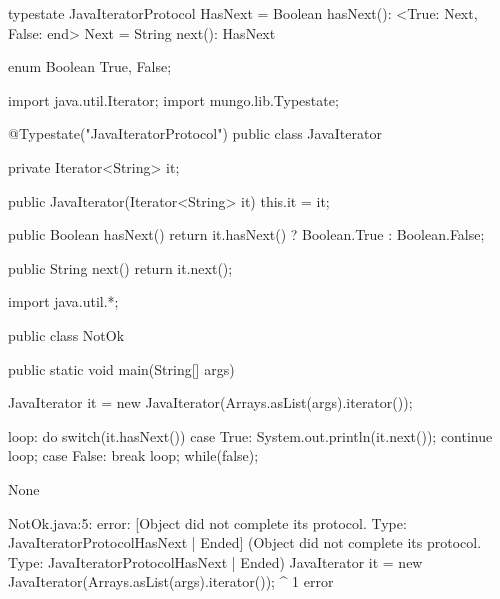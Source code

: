\begin{code}
typestate JavaIteratorProtocol {
  HasNext = {
    Boolean hasNext(): <True: Next, False: end>
  }
  Next = {
    String next(): HasNext
  }
}\end{code}

\begin{code}
enum Boolean {
	True, False;
}\end{code}

\begin{code}
import java.util.Iterator;
import mungo.lib.Typestate;

@Typestate("JavaIteratorProtocol")
public class JavaIterator {

  private Iterator<String> it;

  public JavaIterator(Iterator<String> it) {
    this.it = it;
  }

	public Boolean hasNext() {
    return it.hasNext() ? Boolean.True : Boolean.False;
  }

  public String next() {
    return it.next();
  }

}\end{code}

\begin{code}
import java.util.*;

public class NotOk {
	public static void main(String[] args) {
		JavaIterator it = new JavaIterator(Arrays.asList(args).iterator());

    loop: do {
      switch(it.hasNext()) {
        case True:
          System.out.println(it.next());
          continue loop;
        case False:
          break loop;
      }
    } while(false);
	}
}\end{code}

\lstset{caption=Original Mungo output}
\begin{code}
None
\end{code}

\lstset{caption=New Mungo output}
\begin{code}
NotOk.java:5: error: [Object did not complete its protocol. Type: JavaIteratorProtocol{HasNext} | Ended] (Object did not complete its protocol. Type: JavaIteratorProtocol{HasNext} | Ended)
		JavaIterator it = new JavaIterator(Arrays.asList(args).iterator());
		             ^
1 error
\end{code}

